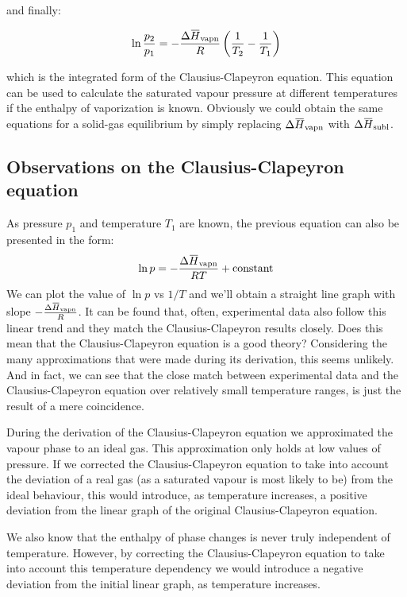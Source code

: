 \documentclass[12pt,a4paper]{report}
\newcommand{\overbar}[1]{\mkern 1.5mu\overline{\mkern-1.5mu#1\mkern-1.5mu}\mkern 1.5mu}
\newif\ifstudents
\begin{document}
   and finally:
   \ifstudents \hideit[2]{ \fi
   \begin{equation*}
   \ln \frac{p_{2}}{p_{1}}=-\frac{\Delta \overbar{H}_{\mathrm{vapn}}}{R} \left(\frac{1}{T_{2}}-\frac{1}{T_{1}}\right)
   \end{equation*}   
   \ifstudents } \fi
   which is the integrated form of the Clausius-Clapeyron equation. This equation can be used to calculate the saturated vapour pressure at different temperatures if the enthalpy of vaporization is known. 
    Obviously we could obtain the same equations for a solid-gas equilibrium by simply replacing $\Delta \overbar{H}_{\mathrm{vapn}}$ with $\Delta \overbar{H}_{\mathrm{subl}}$.
   \subsection*{Observations on the Clausius-Clapeyron equation}
   As pressure $p_{1}$ and temperature $T_{1}$ are known, the previous equation can also be presented in the form:
   \begin{equation*}
   \ln p=-\frac{\Delta \overbar{H}_{\mathrm{vapn}}}{R T} + \mathrm{constant}
   \end{equation*} 
   We can plot the value of $\ln p$ vs $1/T$ and we'll obtain a straight line graph with slope  $-\frac{\Delta \overbar{H}_{\mathrm{vapn}}}{R}$. It can be found that, often, experimental data also follow this linear trend and they match the Clausius-Clapeyron results closely. Does this mean that the Clausius-Clapeyron equation is a good theory? Considering the many approximations that were made during its derivation, this seems unlikely. And in fact, we can see that the close match between experimental data and the Clausius-Clapeyron equation over relatively small temperature ranges, is just the result of a mere coincidence.
   
   During the derivation of the Clausius-Clapeyron equation we approximated the vapour phase to an ideal gas. This approximation only holds at low values of pressure. If we corrected the Clausius-Clapeyron equation to take into account the deviation of a real gas (as a saturated vapour is most likely to be) from the ideal behaviour, this would introduce, as temperature increases, a positive deviation from the linear graph of the original Clausius-Clapeyron equation.
   
   We also know that the enthalpy of phase changes is never truly independent of temperature. However, by correcting the Clausius-Clapeyron equation to take into account this temperature dependency we would introduce a negative deviation from the initial linear graph, as temperature increases.
   
\end{document}
